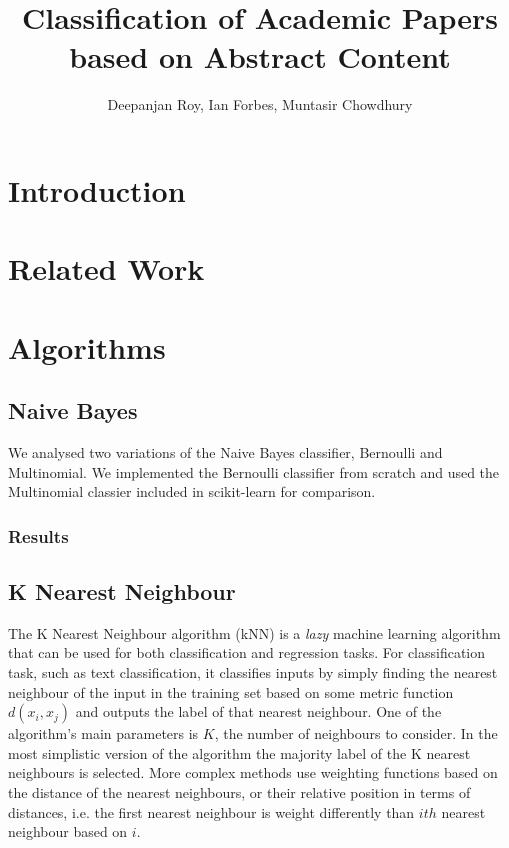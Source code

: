 \documentclass[10pt,twocolumn]{article}
\title {Classification of Academic Papers based on Abstract Content}
\author {Deepanjan Roy, Ian Forbes, Muntasir Chowdhury}
\begin{document}
\maketitle
{}

\section{Introduction}
\section{Related Work}

\section{Algorithms}
\subsection{Naive Bayes}
We analysed two variations of the Naive Bayes classifier, Bernoulli and Multinomial. We implemented the Bernoulli classifier from scratch and used the Multinomial classier included in scikit-learn for comparison.
\subsubsection{Results}
\subsection{K Nearest Neighbour}
The K Nearest Neighbour algorithm (kNN) is a \textit{lazy} machine learning algorithm that can be used for both classification and regression tasks. For classification task, such as text classification, it classifies inputs by simply finding the nearest neighbour of the input in the training set based on some metric function $d(x_i,x_j)$ and outputs the label of that nearest neighbour. One of the algorithm's main parameters is $K$, the number of neighbours to consider. In the most simplistic version of the algorithm the majority label of the K nearest neighbours is selected. More complex methods use weighting functions based on the distance of the nearest neighbours, or their relative position in terms of distances, i.e. the first nearest neighbour is weight differently than $ith$ nearest neighbour based on $i$.
\end{document}
